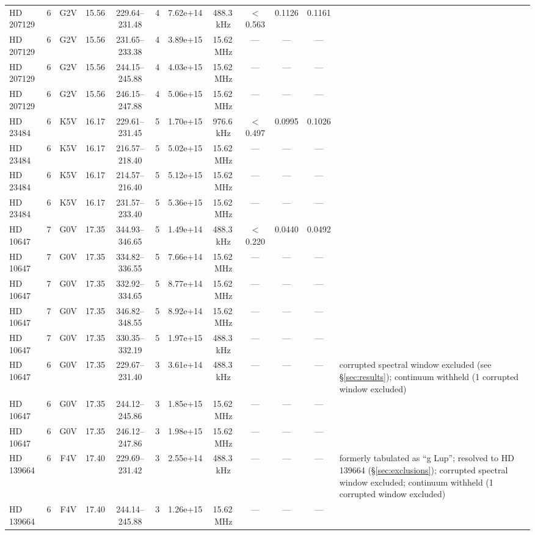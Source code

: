 \documentclass{openjournal}
\begin{document}
\begin{table}
\begin{tabularx}{\textwidth}{@{}l c c c c c c c c c c X@{}}
 HD 207129 & 6 & G2V & 15.56 & 229.64--231.48 & 4 & 7.62e+14 & 488.3\,kHz & $<$0.563 & 0.1126 & 0.1161 &  \\
 HD 207129 & 6 & G2V & 15.56 & 231.65--233.38 & 4 & 3.89e+15 & 15.62\,MHz & --- & --- & --- &  \\
 HD 207129 & 6 & G2V & 15.56 & 244.15--245.88 & 4 & 4.03e+15 & 15.62\,MHz & --- & --- & --- &  \\
 HD 207129 & 6 & G2V & 15.56 & 246.15--247.88 & 4 & 5.06e+15 & 15.62\,MHz & --- & --- & --- &  \\
 HD 23484 & 6 & K5V & 16.17 & 229.61--231.45 & 5 & 1.70e+15 & 976.6\,kHz & $<$0.497 & 0.0995 & 0.1026 &  \\
 HD 23484 & 6 & K5V & 16.17 & 216.57--218.40 & 5 & 5.02e+15 & 15.62\,MHz & --- & --- & --- &  \\
 HD 23484 & 6 & K5V & 16.17 & 214.57--216.40 & 5 & 5.12e+15 & 15.62\,MHz & --- & --- & --- &  \\
 HD 23484 & 6 & K5V & 16.17 & 231.57--233.40 & 5 & 5.36e+15 & 15.62\,MHz & --- & --- & --- &  \\
 HD 10647 & 7 & G0V & 17.35 & 344.93--346.65 & 5 & 1.49e+14 & 488.3\,kHz & $<$0.220 & 0.0440 & 0.0492 &  \\
 HD 10647 & 7 & G0V & 17.35 & 334.82--336.55 & 5 & 7.66e+14 & 15.62\,MHz & --- & --- & --- &  \\
 HD 10647 & 7 & G0V & 17.35 & 332.92--334.65 & 5 & 8.77e+14 & 15.62\,MHz & --- & --- & --- &  \\
 HD 10647 & 7 & G0V & 17.35 & 346.82--348.55 & 5 & 8.92e+14 & 15.62\,MHz & --- & --- & --- &  \\
 HD 10647 & 7 & G0V & 17.35 & 330.35--332.19 & 5 & 1.97e+15 & 488.3\,kHz & --- & --- & --- &  \\
 HD 10647 & 6 & G0V & 17.35 & 229.67--231.40 & 3 & 3.61e+14 & 488.3\,kHz & --- & --- & --- & corrupted spectral window excluded (see \S\ref{sec:results}); continuum withheld (1 corrupted window excluded) \\
 HD 10647 & 6 & G0V & 17.35 & 244.12--245.86 & 3 & 1.85e+15 & 15.62\,MHz & --- & --- & --- &  \\
 HD 10647 & 6 & G0V & 17.35 & 246.12--247.86 & 3 & 1.98e+15 & 15.62\,MHz & --- & --- & --- &  \\
 HD 139664 & 6 & F4V & 17.40 & 229.69--231.42 & 3 & 2.55e+14 & 488.3\,kHz & --- & --- & --- & formerly tabulated as ``g Lup''; resolved to HD 139664 (\S\ref{sec:exclusions}); corrupted spectral window excluded; continuum withheld (1 corrupted window excluded) \\
 HD 139664 & 6 & F4V & 17.40 & 244.14--245.88 & 3 & 1.26e+15 & 15.62\,MHz & --- & --- & --- &  \\
\hline
\end{tabularx}
\end{table}
\end{document}
